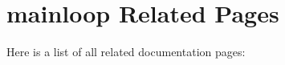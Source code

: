 \section{mainloop Related Pages}
Here is a list of all related documentation pages:\begin{CompactList}
\item {}

\end{CompactList}

